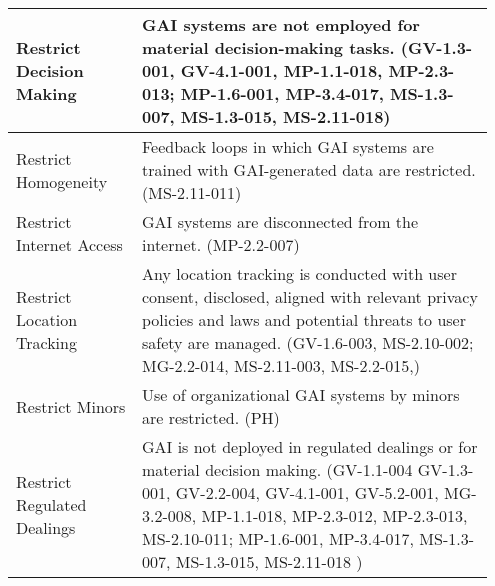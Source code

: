 \documentclass[fleqn]{article}
\begin{document}
\begin{table}[H]
\begin{tabular}{|m{0.25\linewidth} |m{0.70\linewidth} |}
		Restrict Decision Making  & GAI systems are not employed for material decision-making tasks. (GV-1.3-001, GV-4.1-001, MP-1.1-018, MP-2.3-013; MP-1.6-001, MP-3.4-017, MS-1.3-007, MS-1.3-015, MS-2.11-018)  \\ \hline		
		Restrict Homogeneity & Feedback loops in which GAI systems are trained with GAI-generated data are restricted. (MS-2.11-011)  \\ 
		\hline
		Restrict Internet Access & GAI systems are disconnected from the internet. (MP-2.2-007)  \\ 
		\hline		
		Restrict Location Tracking & Any location tracking is conducted with user consent, disclosed, aligned with relevant privacy policies and laws and potential threats to user safety are managed. (GV-1.6-003, MS-2.10-002; MG-2.2-014, MS-2.11-003, MS-2.2-015,)  \\ 
		\hline		
		Restrict Minors & Use of organizational GAI systems by minors are restricted. (PH)  \\ 
		\hline
		Restrict Regulated Dealings & GAI is not deployed in regulated dealings or for material decision making. (GV-1.1-004 GV-1.3-001, GV-2.2-004, GV-4.1-001, GV-5.2-001, MG-3.2-008, MP-1.1-018, MP-2.3-012, MP-2.3-013, MS-2.10-011; MP-1.6-001, MP-3.4-017, MS-1.3-007, MS-1.3-015, MS-2.11-018 ) \\ 
		\hline			
	\end{tabular}
\end{table}
\pagebreak
\end{document}
